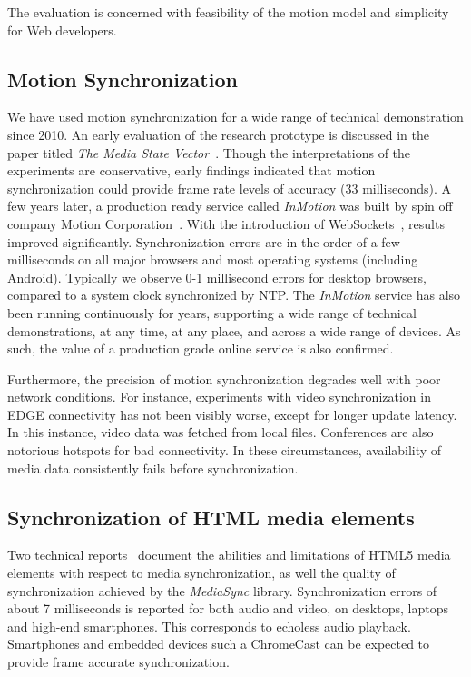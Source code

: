 The evaluation is concerned with feasibility of the motion model and
simplicity for Web developers.


\subsection {Motion Synchronization}

We have used motion synchronization for a wide range of technical
demonstration since 2010. An early evaluation of the research prototype is
discussed in the paper titled \emph{The Media State Vector}~\cite{msv}. Though
the interpretations of the experiments are conservative, early findings
indicated that motion synchronization could provide frame rate levels of
accuracy (33 milliseconds). A few years later, a production ready service
called \emph{InMotion} was built by spin off company Motion
Corporation~\cite{mcorp}. With the introduction of
WebSockets~\cite{websocket}, results improved significantly. Synchronization
errors are in the order of a few milliseconds on all major browsers and most
operating systems (including Android). Typically we observe 0-1 millisecond
errors for desktop browsers, compared to a system clock synchronized by NTP.
The \emph{InMotion} service has also been running continuously for years,
supporting a wide range of technical demonstrations, at any time, at any
place, and across a wide range of devices. As such, the value of a production
grade online service is also confirmed.

Furthermore, the precision of motion synchronization degrades well with poor
network conditions. For instance, experiments with video synchronization in
EDGE connectivity has not been visibly worse, except for longer update
latency. In this instance, video data was fetched from local files.
Conferences are also notorious hotspots for bad connectivity. In these
circumstances, availability of media data consistently fails before
synchronization.


\subsection {Synchronization of HTML media elements}

Two technical reports~\cite{syncreport1,syncreport2} document the abilities
and limitations of HTML5 media elements with respect to media synchronization,
as well the quality of synchronization achieved by the \emph{MediaSync}
library. Synchronization errors of about 7 milliseconds is reported for both
audio and video, on desktops, laptops and high-end smartphones. This
corresponds to echoless audio playback. Smartphones and embedded devices such
a ChromeCast can be expected to provide frame accurate synchronization. 

